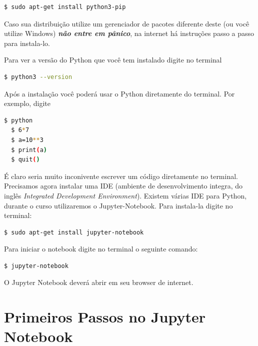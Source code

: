 \begin{lstlisting}[language=bash]
  $ sudo apt-get install python3-pip
\end{lstlisting}
Caso sua distribuição utilize um gerenciador de pacotes diferente deste (ou você utilize Windows) {\it \bf não entre em pânico}, na internet há instruções passo a passo para instala-lo. 

Para ver a versão do Python que você tem instalado digite no terminal
\begin{lstlisting}[language=bash]
  $ python3 --version
\end{lstlisting}
Após a instalação você poderá usar o Python diretamente do terminal. Por exemplo, digite
\begin{lstlisting}[language=bash]
  $ python
  $ 6*7
  $ a=10**3
  $ print(a)
  $ quit()
\end{lstlisting}

É claro seria muito inconivente escrever um código diretamente no terminal. Precisamos agora instalar uma IDE (ambiente de desenvolvimento integra, do inglês {\it Integrated Development Environment}). Existem várias IDE para Python, durante o curso utilizaremos o Jupyter-Notebook. Para instala-la digite no terminal:

\begin{lstlisting}[language=bash]
  $ sudo apt-get install jupyter-notebook
\end{lstlisting}

Para iniciar o notebook digite no terminal o seguinte comando:
\begin{lstlisting}[language=bash]
  $ jupyter-notebook
\end{lstlisting}
O Jupyter Notebook deverá abrir em seu browser de internet.

\section{Primeiros Passos no Jupyter Notebook}

